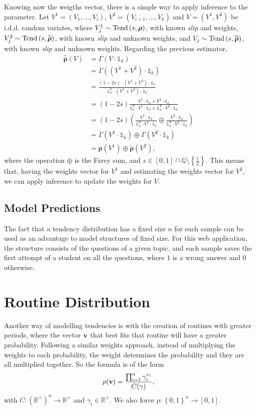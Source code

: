 \documentclass{article}
\newcommand{\0}{\mathbbold{0}}
\newcommand{\1}{\mathds{1}}
\newcommand{\2}{\mathbbold{2}}
\newcommand{\T}{^{\operatorname{T}}}
\newcommand{\Tend}[2]{\textup{Tend}\left(#1,#2\right)}
\begin{document}
Knowing now the weigths vector, there is a simple way to apply inference to the parameter.
Let $V^1 = \left(V_1, \dots, V_i\right)$, $V^2 = \left(V_{i+1}, \dots, V_k\right)$ and $V = \left(V^1, V^2\right)$ be i.d.d. random variates, where $V^1_j \sim \Tend{s}{\boldsymbol \rho}$, with known \textsl{slip} and weights, $V^2_j \sim \Tend{s}{\widetilde{\boldsymbol \rho}}$, with known \textsl{slip} and unknown weights, and $V_j \sim \Tend{s}{\widehat{\boldsymbol \rho}}$, with known \textsl{slip} and unknown weights.
Regarding the previous estimator,
\begin{align*}
    \widehat{\boldsymbol \rho}(V) &= \varGamma(V\cdot\1_k) \\
    &= \varGamma((V^1 + V^2)\cdot\1_k) \\
    &= \frac{(1-2s)\cdot (V^1 + V^2)\cdot\1_k}{\1_n\T\cdot(V^1 + V^2)\cdot\1_k} \\
    &= (1-2s)\frac{V^1\cdot\1_k + V^2\cdot\1_k}{\1_n\T\cdot V^1\cdot\1_k + \1_n\T\cdot V^2\cdot\1_k} \\
    &= (1-2s)\left(\frac{V^1\cdot\1_k}{\1_n\T\cdot V^1\cdot\1_k} \oplus \frac{V^2\cdot\1_k}{\1_n\T\cdot V^2\cdot\1_k}\right) \\
    &= \varGamma(V^1\cdot\1_k) \oplus \varGamma(V^2\cdot\1_k) \\
    &= {\boldsymbol \rho}(V^1) \oplus \widetilde{\boldsymbol \rho}(V^2),
\end{align*}
where the operation $\oplus$ is the Farey sum, and $s \in [0,1] \cap \mathbb{Q} \setminus \left\{\frac{1}{2}\right\}$. This means that, having the weights vector for $V^1$ and estimating the weights vector for $V^2$, we can apply inference to update the weights for $V$.

\subsection{Model Predictions}
The fact that a tendency distribution has a fixed size $n$ for each sample can be used as an advantage to model structures of fixed size.
For this web application, the structure consists of the questions of a given topic, and each sample saves the first attempt of a student on all the questions, where $1$ is a wrong answer and $0$ otherwise.



\section{Routine Distribution}
Another way of modelling tendencies is with the creation of routines with greater periods, where the vector ${\bf v}$ that best fits that routine will have a greater probability. Following a similar weights approach, instead of multiplying the weights to each probability, the weight determines the probability and they are all multiplied together.
So the formula is of the form
\begin{equation}
    p({\bf v}) = \frac{\prod_{i=1}^{n}\gamma_i^{v_i}}{C(\gamma)}, \label{eqtendency2}
\end{equation}
with $C\colon \left(\mathbb{R}^+\right)^n \longrightarrow \mathbb{R}^+$ and $\gamma_i \in \mathbb{R}^+$. We also force $p\colon \left\{0,1\right\}^n \longrightarrow \left[0,1\right]$.
\end{document}
